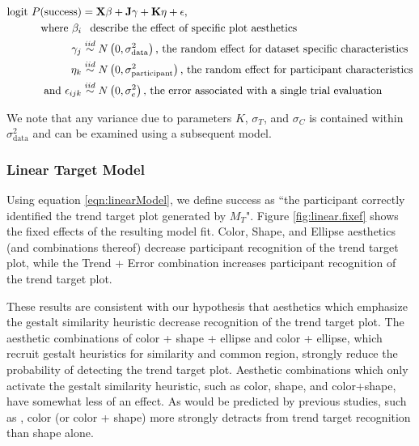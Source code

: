 \documentclass[11pt]{isuthesis}\usepackage[]{graphicx}\usepackage[]{color}
\begin{document}
\begin{align}
\text{logit }P(\text{success}) & =  \textbf{X}\beta + \textbf{J}\gamma + \textbf{K}\eta + \epsilon, \label{eqn:linearModel}\\
\text{where } \beta_i & \hphantom{\sim} \text{describe the effect of specific plot aesthetics}\nonumber\\
\hphantom{where } \gamma_j & \overset{iid}{\sim} N\left(0, \sigma^2_{\text{data}}\right)\text{, the random effect for dataset specific characteristics}\nonumber\\
\hphantom{where } \eta_k & \overset{iid}{\sim} N\left(0, \sigma^2_{\text{participant}}\right)\text{, the random effect for participant characteristics}\nonumber\\
\text{and } \epsilon_{ijk} & \overset{iid}{\sim}  N\left(0, \sigma^2_e\right)\text{, the error associated with a single trial evaluation} \nonumber
\end{align}

We note that any variance due to parameters $K$, $\sigma_T$, and $\sigma_C$ is contained within $\sigma^2_{\text{data}}$ and can be examined using a subsequent model. 

\subsubsection{Linear Target Model}



Using equation \ref{eqn:linearModel}, we define success as ``the participant correctly identified the trend target plot generated by $M_T$". Figure \ref{fig:linear.fixef} shows the fixed effects of the resulting model fit. Color, Shape, and Ellipse aesthetics (and combinations thereof) decrease participant recognition of the trend target plot, while the Trend + Error combination increases participant recognition of the trend target plot.

These results are consistent with our hypothesis that aesthetics which emphasize the gestalt similarity heuristic decrease recognition of the trend target plot. The aesthetic combinations of color + shape + ellipse and color + ellipse, which recruit gestalt heuristics for similarity and common region, strongly reduce the probability of detecting the trend target plot. Aesthetic combinations which only activate the gestalt similarity heuristic, such as color, shape, and color+shape, have somewhat less of an effect. As would be predicted by previous studies, such as \citet{lewandowsky1989discriminating}, color (or color + shape) more strongly detracts from trend target recognition than shape alone. 
\end{document}
